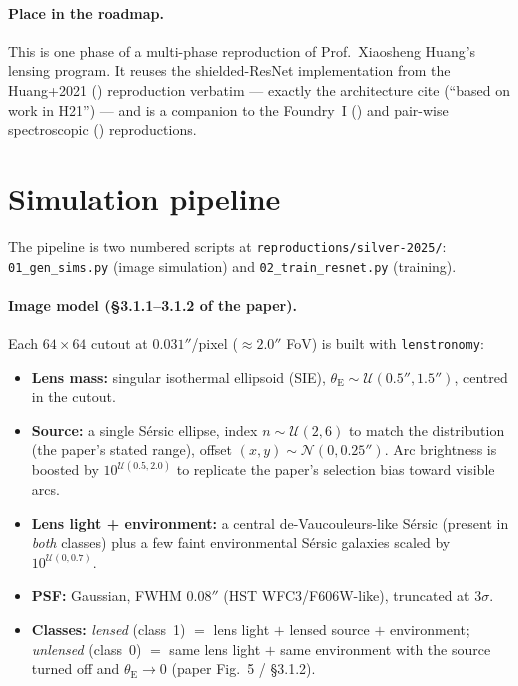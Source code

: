 \documentclass[11pt,letterpaper]{article}
\newcommand{\thetaE}{\ensuremath{\theta_{\mathrm{E}}}}
\begin{document}
\paragraph{Place in the roadmap.} This is one phase of a multi-phase
reproduction of Prof.~Xiaosheng Huang's lensing program. It reuses the
shielded-ResNet implementation from the Huang+2021
(\citealt{huang2021desi}) reproduction verbatim --- exactly the
architecture \citet{silver2025ml} cite (``based on work in H21'') ---
and is a companion to the Foundry~I (\citealt{huang2025foundry1}) and
pair-wise spectroscopic (\citealt{hsu2025pairwise}) reproductions.

\section{Simulation pipeline}

The pipeline is two numbered scripts at
\texttt{reproductions/silver-2025/}: \texttt{01\_gen\_sims.py}
(image simulation) and \texttt{02\_train\_resnet.py} (training).

\paragraph{Image model (\S3.1.1--3.1.2 of the paper).} Each $64\times64$
cutout at $0.031''$/pixel ($\approx 2.0''$ FoV) is built with
\texttt{lenstronomy}:
\begin{itemize}
\item \textbf{Lens mass:} singular isothermal ellipsoid (SIE),
      $\thetaE \sim \mathcal{U}(0.5'', 1.5'')$, centred in the cutout.
\item \textbf{Source:} a single S\'ersic ellipse, index
      $n \sim \mathcal{U}(2,6)$ to match the \citet{simard2011sersic}
      distribution (the paper's stated range), offset
      $(x,y) \sim \mathcal{N}(0, 0.25'')$. Arc brightness is boosted by
      $10^{\mathcal{U}(0.5,2.0)}$ to replicate the paper's selection
      bias toward visible arcs.
\item \textbf{Lens light + environment:} a central de-Vaucouleurs-like
      S\'ersic (present in \emph{both} classes) plus a few faint
      environmental S\'ersic galaxies scaled by $10^{\mathcal{U}(0,0.7)}$.
\item \textbf{PSF:} Gaussian, FWHM $0.08''$ (HST WFC3/F606W-like),
      truncated at $3\sigma$.
\item \textbf{Classes:} \emph{lensed} (class~1) $=$ lens light $+$ lensed
      source $+$ environment; \emph{unlensed} (class~0) $=$ same lens
      light $+$ same environment with the source turned off and
      $\thetaE \to 0$ (paper Fig.~5 / \S3.1.2).
\end{itemize}
\end{document}
